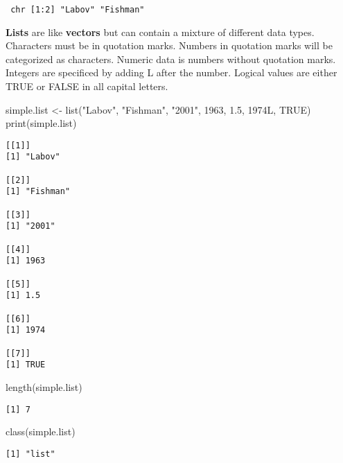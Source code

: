 \documentclass[
  10pt,
  letterpaper]{article}
\newenvironment{Shaded}{\begin{snugshade}}{\end{snugshade}}
\newcommand{\ConstantTok}[1]{\textcolor[rgb]{0.56,0.35,0.01}{#1}}
\newcommand{\DecValTok}[1]{\textcolor[rgb]{0.68,0.00,0.00}{#1}}
\newcommand{\FloatTok}[1]{\textcolor[rgb]{0.68,0.00,0.00}{#1}}
\newcommand{\FunctionTok}[1]{\textcolor[rgb]{0.28,0.35,0.67}{#1}}
\newcommand{\NormalTok}[1]{\textcolor[rgb]{0.00,0.23,0.31}{#1}}
\newcommand{\OtherTok}[1]{\textcolor[rgb]{0.00,0.23,0.31}{#1}}
\newcommand{\StringTok}[1]{\textcolor[rgb]{0.13,0.47,0.30}{#1}}
\renewcommand\texttt[1]{{\ttfamily\color{BrickRed}#1}}
\begin{document}
\begin{verbatim}
 chr [1:2] "Labov" "Fishman"
\end{verbatim}

\textbf{Lists} are like \textbf{vectors} but can contain a mixture of
different data types. Characters must be in quotation marks. Numbers in
quotation marks will be categorized as characters. Numeric data is
numbers without quotation marks. Integers are specificed by adding
\texttt{L} after the number. Logical values are either \texttt{TRUE} or
\texttt{FALSE} in all capital letters.

\begin{Shaded}
\begin{Highlighting}[]
\NormalTok{simple.list }\OtherTok{\textless{}{-}} \FunctionTok{list}\NormalTok{(}\StringTok{"Labov"}\NormalTok{, }\StringTok{"Fishman"}\NormalTok{, }\StringTok{"2001"}\NormalTok{, }\DecValTok{1963}\NormalTok{,}
    \FloatTok{1.5}\NormalTok{, 1974L, }\ConstantTok{TRUE}\NormalTok{)}
\FunctionTok{print}\NormalTok{(simple.list)}
\end{Highlighting}
\end{Shaded}

\begin{verbatim}
[[1]]
[1] "Labov"

[[2]]
[1] "Fishman"

[[3]]
[1] "2001"

[[4]]
[1] 1963

[[5]]
[1] 1.5

[[6]]
[1] 1974

[[7]]
[1] TRUE
\end{verbatim}

\begin{Shaded}
\begin{Highlighting}[]
\FunctionTok{length}\NormalTok{(simple.list)}
\end{Highlighting}
\end{Shaded}

\begin{verbatim}
[1] 7
\end{verbatim}

\begin{Shaded}
\begin{Highlighting}[]
\FunctionTok{class}\NormalTok{(simple.list)}
\end{Highlighting}
\end{Shaded}

\begin{verbatim}
[1] "list"
\end{verbatim}
\end{document}
